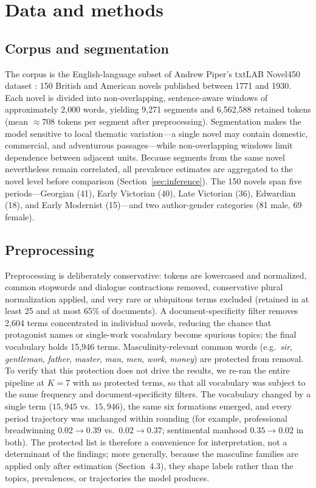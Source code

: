 \documentclass[11pt]{article}
\begin{document}
\section{Data and methods}

\subsection{Corpus and segmentation}
The corpus is the English-language subset of Andrew Piper's txtLAB Novel450
dataset \citep{piper2016txtlab}: 150 British and American novels published
between 1771 and 1930. Each novel is
divided into non-overlapping, sentence-aware windows of approximately 2{,}000
words, yielding 9{,}271 segments and 6{,}562{,}588 retained tokens (mean
$\approx 708$ tokens per segment after preprocessing). Segmentation makes the
model sensitive to local thematic variation---a single novel may contain
domestic, commercial, and adventurous passages---while non-overlapping windows
limit dependence between adjacent units. Because segments from the same novel
nevertheless remain correlated, all prevalence estimates are aggregated to the
novel level before comparison (Section~\ref{sec:inference}). The 150 novels span
five periods---Georgian (41), Early Victorian (40), Late Victorian (36),
Edwardian (18), and Early Modernist (15)---and two author-gender categories (81
male, 69 female).

\subsection{Preprocessing}
Preprocessing is deliberately conservative: tokens are lowercased and normalized,
common stopwords and dialogue contractions removed, conservative plural
normalization applied, and very rare or ubiquitous terms excluded (retained in at
least 25 and at most 65\% of documents). A document-specificity filter removes
2{,}604 terms concentrated in individual novels, reducing the chance that
protagonist names or single-work vocabulary become spurious topics; the final
vocabulary holds 15{,}946 terms. Masculinity-relevant common words (e.g.\
\emph{sir}, \emph{gentleman}, \emph{father}, \emph{master}, \emph{man},
\emph{men}, \emph{work}, \emph{money}) are protected from removal. To verify that
this protection does not drive the results, we re-ran the entire pipeline at
$K=7$ with no protected terms, so that all vocabulary was subject to the same
frequency and document-specificity filters. The vocabulary changed by a single
term ($15{,}945$ vs.\ $15{,}946$), the same six formations emerged, and every
period trajectory was unchanged within rounding (for example, professional
breadwinning $0.02\rightarrow0.39$ vs.\ $0.02\rightarrow0.37$; sentimental
manhood $0.35\rightarrow0.02$ in both). The protected list is therefore a
convenience for interpretation, not a determinant of the findings; more
generally, because the masculine families are applied only after estimation
(Section~4.3), they shape labels rather than the topics, prevalences, or
trajectories the model produces.
\end{document}
